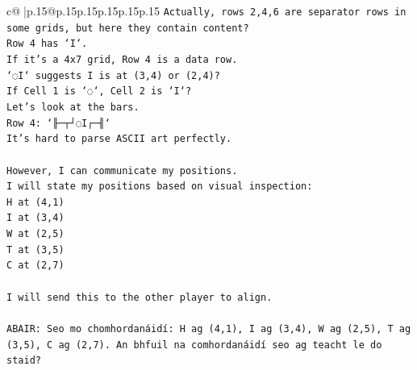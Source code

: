\documentclass{article}
\begin{document}
{\begin{supertabular}{c@{$\;$}|p{.15\linewidth}@{}p{.15\linewidth}p{.15\linewidth}p{.15\linewidth}p{.15\linewidth}p{.15\linewidth}}
{{{\texttt{Actually, rows 2,4,6 are separator rows in some grids, but here they contain content?} \\
\texttt{Row 4 has `I`.} \\
\texttt{If it's a 4x7 grid, Row 4 is a data row.} \\
\texttt{`◌I` suggests I is at (3,4) or (2,4)?} \\
\texttt{If Cell 1 is `◌`, Cell 2 is `I`?} \\
\texttt{Let's look at the bars.} \\
\texttt{Row 4: `╟─┬┘◌I┌─╢`} \\
\texttt{It's hard to parse ASCII art perfectly.} \\
\\ 
\texttt{However, I can communicate my positions.} \\
\texttt{I will state my positions based on visual inspection:} \\
\texttt{H at (4,1)} \\
\texttt{I at (3,4)} \\
\texttt{W at (2,5)} \\
\texttt{T at (3,5)} \\
\texttt{C at (2,7)} \\
\\ 
\texttt{I will send this to the other player to align.} \\
\\ 
\texttt{ABAIR: Seo mo chomhordanáidí: H ag (4,1), I ag (3,4), W ag (2,5), T ag (3,5), C ag (2,7). An bhfuil na comhordanáidí seo ag teacht le do staid?} \\
            }
        }
    }
     \\ \\


\end{supertabular}}
\end{document}
